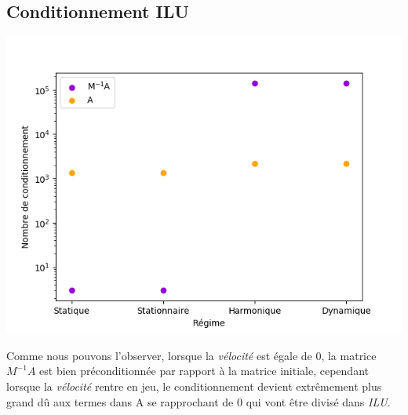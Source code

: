 \documentclass{article}[11pt]
\begin{document}
\subsection{Conditionnement ILU}
\noindent\begin{minipage}{0.5\textwidth}
\includegraphics[width=\textwidth]{res/plots/conditionnementILU.png}
\end{minipage}%
\begin{minipage}{0.5\textwidth}
Comme nous pouvons l'observer, lorsque la \textit{vélocité} est égale de 0, la matrice $M^{-1}A$ est bien préconditionnée par rapport à la matrice initiale, cependant lorsque la \textit{vélocité} rentre en jeu, le conditionnement devient extrêmement plus grand dû aux termes dans A se rapprochant de 0 qui vont être divisé dans \textit{ILU}.
\end{minipage}
\end{document}
